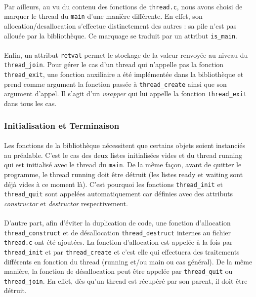 \paragraph{} Par ailleurs, au vu du contenu des fonctions de
\texttt{thread.c}, nous avons choisi de marquer le thread du
\texttt{main} d'une manière différente. En effet, son
allocation/desallocation s'effectue distinctement des autres : sa pile
n'est pas allouée par la bibliothèque. Ce marquage se traduit par un
attribut \texttt{is\_main}.
\paragraph{} Enfin, un attribut \texttt{retval} permet le stockage de
la valeur renvoyée au niveau du \texttt{thread\_join}. Pour gérer le
cas d'un thread qui n'appelle pas la fonction \texttt{thread\_exit},
une fonction auxiliaire a été implémentée dans la bibliothèque et
prend comme argument la fonction passée à \texttt{thread\_create}
ainsi que son argument d'appel. Il s'agit d'un \emph{wrapper} qui lui
appelle la fonction \texttt{thread\_exit} dans tous les cas.

\subsubsection{Initialisation et Terminaison}

\paragraph{}
Les fonctions de la bibliothèque nécessitent que
certains objets soient instanciés au préalable. C'est le cas des deux
listes initialisées vides et du thread running qui est initialisé avec le thread du
\texttt{main}. De la même façon, avant de quitter le programme, le
thread running doit être détruit (les listes ready et waiting sont
déjà vides à ce moment là). C'est pourquoi les
fonctions \texttt{thread\_init} et \texttt{thread\_quit} sont
appelées automatiquement car définies avec des attributs
\emph{constructor} et \emph{destructor} respectivement.

\paragraph{}
D'autre part, afin d'éviter la duplication de code, une
fonction d'allocation \texttt{thread\_construct} et de désallocation
\texttt{thread\_destruct} internes au fichier \texttt{thread.c} ont
été ajoutées. La fonction d'allocation est appelée à la fois par
\texttt{thread\_init} et par \texttt{thread\_create} et c'est elle qui
effectuera des traitements différents en fonction du thread (running
et/ou main ou cas général). De la même manière, la fonction de
désallocation peut être appelée par \texttt{thread\_quit} ou
\texttt{thread\_join}. En effet, dès qu'un thread est récupéré par son
parent, il doit être détruit.


